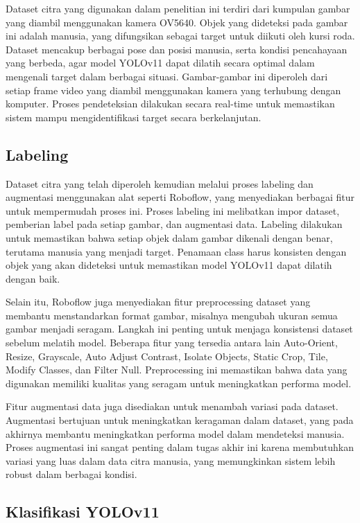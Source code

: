 Dataset citra yang digunakan dalam penelitian ini terdiri dari kumpulan gambar yang diambil menggunakan kamera OV5640. Objek yang dideteksi pada gambar ini adalah manusia, yang difungsikan sebagai target untuk diikuti oleh kursi roda. Dataset mencakup berbagai pose dan posisi manusia, serta kondisi pencahayaan yang berbeda, agar model YOLOv11 dapat dilatih secara optimal dalam mengenali target dalam berbagai situasi. Gambar-gambar ini diperoleh dari setiap frame video yang diambil menggunakan kamera yang terhubung dengan komputer. Proses pendeteksian dilakukan secara real-time untuk memastikan sistem mampu mengidentifikasi target secara berkelanjutan.

\subsection{Labeling}
\label{subsec:labeling}

Dataset citra yang telah diperoleh kemudian melalui proses labeling dan augmentasi menggunakan alat seperti Roboflow, yang menyediakan berbagai fitur untuk mempermudah proses ini. Proses labeling ini melibatkan impor dataset, pemberian label pada setiap gambar, dan augmentasi data. Labeling dilakukan untuk memastikan bahwa setiap objek dalam gambar dikenali dengan benar, terutama manusia yang menjadi target. Penamaan class harus konsisten dengan objek yang akan dideteksi untuk memastikan model YOLOv11 dapat dilatih dengan baik.

Selain itu, Roboflow juga menyediakan fitur preprocessing dataset yang membantu menstandarkan format gambar, misalnya mengubah ukuran semua gambar menjadi seragam. Langkah ini penting untuk menjaga konsistensi dataset sebelum melatih model. Beberapa fitur yang tersedia antara lain Auto-Orient, Resize, Grayscale, Auto Adjust Contrast, Isolate Objects, Static Crop, Tile, Modify Classes, dan Filter Null. Preprocessing ini memastikan bahwa data yang digunakan memiliki kualitas yang seragam untuk meningkatkan performa model.

Fitur augmentasi data juga disediakan untuk menambah variasi pada dataset. Augmentasi bertujuan untuk meningkatkan keragaman dalam dataset, yang pada akhirnya membantu meningkatkan performa model dalam mendeteksi manusia. Proses augmentasi ini sangat penting dalam tugas akhir ini karena membutuhkan variasi yang luas dalam data citra manusia, yang memungkinkan sistem lebih robust dalam berbagai kondisi.

\subsection{Klasifikasi YOLOv11}
\label{subsec:klasifikasiYOLOv11}

